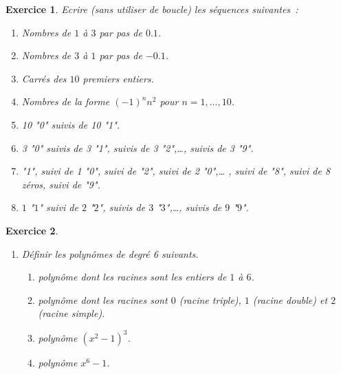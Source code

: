 \documentclass{article}
\newtheorem{exo}{Exercice}[section]
\begin{document}
\begin{giacjshere}
\begin{exo}{\rm
Ecrire (sans utiliser de boucle) les s\'equences suivantes~:
\begin{enumerate}
\item
Nombres de $1$ \`a $3$ par pas de $0.1$.
\item
Nombres de $3$ \`a $1$ par pas de $-0.1$.
\item
Carr\'es des $10$ premiers entiers.
\item
Nombres de la forme $(-1)^n n^2$ pour $n=1,\ldots,10$.
\item 
10 "0" suivis de 10 "1".
\item 
3 "0" suivis de 3 "1", suivis de 3 "2",\ldots , 
suivis de 3 "9". 
\item
"1", suivi de 1 "0", suivi de "2", suivi de 2 "0",\ldots
, suivi de "8", suivi de 8 z\'eros, suivi de "9".
\item
$1$ "$1$" suivi de $2$ "$2$", suivis de $3$ "$3$",\ldots ,
suivis de $9$ "$9$".
\end{enumerate} 
}\end{exo}

\begin{exo}{\rm ~
\begin{enumerate}
\item
D\'efinir les polyn\^omes de degr\'e 6 suivants.
\begin{enumerate}
\item
polyn\^ome dont les racines sont les entiers de $1$ \`a $6$.
\item
polyn\^ome dont les racines sont $0$ (racine triple), $1$
(racine double) et $2$ (racine simple).
\item
polyn\^ome $(x^2-1)^3$.
\item
polyn\^ome $x^6-1$.
\end{enumerate}
%


\end{enumerate}}
\end{exo}
\end{giacjshere}
\end{document}
